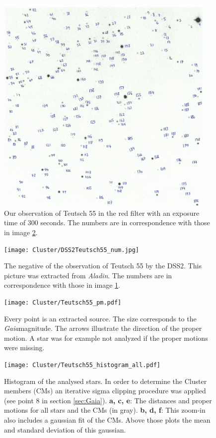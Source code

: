 \documentclass{article}
\begin{document}
\begin{figure}[H]
  \centering
    \includegraphics[width=0.95\textwidth]{Cluster/obsTeutsch55_num.jpg}
  \caption{Our observation of Teutsch 55 in the red filter with an exposure time of 300 seconds. The numbers are in correspondence with those in image \ref{fig:DSS2Teutsch55_num}.}
  \label{fig:obsTeutsch55_num}
\end{figure}

\begin{figure}[H]
  \centering
    \texttt{[image: Cluster/DSS2Teutsch55\_num.jpg]}
  \caption{The negative of the observation of Teutsch 55 by the DSS2. This picture was extracted from \textit{Aladin}. The numbers are in correspondence with those in image \ref{fig:obsTeutsch55_num}.}
  \label{fig:DSS2Teutsch55_num}
\end{figure}

\begin{figure}[H]
  \centering
    \texttt{[image: Cluster/Teutsch55\_pm.pdf]}
  \caption{Every point is an extracted source. The size corresponds to the \textit{Gaia}magnitude. The arrows illustrate the direction of the proper motion. A star was for example not analyzed if the proper motions were missing.}
  \label{fig:Teutsch55_pm}
\end{figure}


\begin{figure}[H]
  \centering
    \texttt{[image: Cluster/Teutsch55\_histogram\_all.pdf]}
  \caption{Histogram of the analysed stars. In order to determine the Cluster members (CMs) an iterative sigma clipping procedure was applied (see point 8 in section \ref{sec:Gaia}). \textbf{a, c, e}: The distances and proper motions for all stars and the CMs (in gray). \textbf{b, d, f}: This zoom-in also includes a gaussian fit of the CMs. Above those plots the mean and standard deviation of this gaussian.}
  \label{fig:Teutsch55_histogram_all}
\end{figure}
\end{document}

